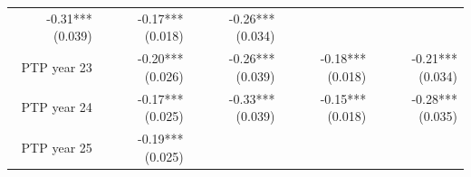 \documentclass[]{article}
\begin{document}
\begin{longtable}[c]{@{}rrrrr@{}}
\begin{minipage}[t]{0.16\columnwidth}
-0.31*** (0.039)
\strut\end{minipage} &
\begin{minipage}[t]{0.18\columnwidth}\raggedleft\strut
-0.17*** (0.018)
\strut\end{minipage} &
\begin{minipage}[t]{0.15\columnwidth}\raggedleft\strut
-0.26*** (0.034)
\strut\end{minipage}\tabularnewline
\begin{minipage}[t]{0.17\columnwidth}\raggedleft\strut
PTP year 23
\strut\end{minipage} &
\begin{minipage}[t]{0.20\columnwidth}\raggedleft\strut
-0.20*** (0.026)
\strut\end{minipage} &
\begin{minipage}[t]{0.16\columnwidth}\raggedleft\strut
-0.26*** (0.039)
\strut\end{minipage} &
\begin{minipage}[t]{0.18\columnwidth}\raggedleft\strut
-0.18*** (0.018)
\strut\end{minipage} &
\begin{minipage}[t]{0.15\columnwidth}\raggedleft\strut
-0.21*** (0.034)
\strut\end{minipage}\tabularnewline
\begin{minipage}[t]{0.17\columnwidth}\raggedleft\strut
PTP year 24
\strut\end{minipage} &
\begin{minipage}[t]{0.20\columnwidth}\raggedleft\strut
-0.17*** (0.025)
\strut\end{minipage} &
\begin{minipage}[t]{0.16\columnwidth}\raggedleft\strut
-0.33*** (0.039)
\strut\end{minipage} &
\begin{minipage}[t]{0.18\columnwidth}\raggedleft\strut
-0.15*** (0.018)
\strut\end{minipage} &
\begin{minipage}[t]{0.15\columnwidth}\raggedleft\strut
-0.28*** (0.035)
\strut\end{minipage}\tabularnewline
\begin{minipage}[t]{0.17\columnwidth}\raggedleft\strut
PTP year 25
\strut\end{minipage} &
\begin{minipage}[t]{0.20\columnwidth}\raggedleft\strut
-0.19*** (0.025)
\strut\end{minipage} &
\begin{minipage}[t]{0.16\columnwidth}\raggedleft\strut

\end{minipage}
\end{longtable}
\end{document}
